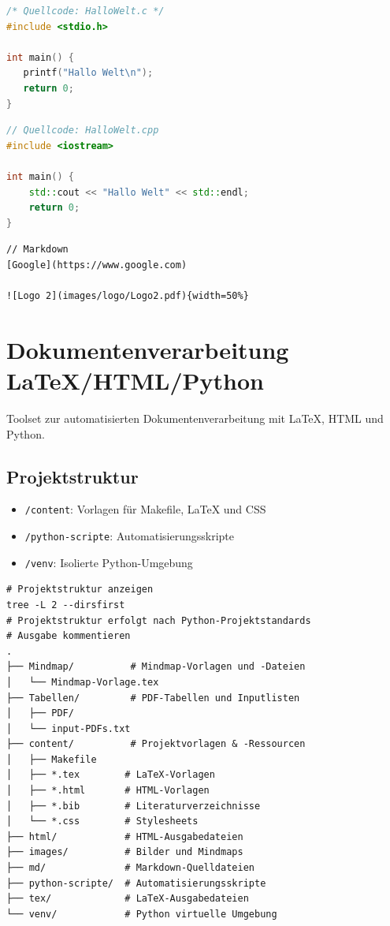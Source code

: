 \documentclass{content/vorlage-design-main}
\begin{document}
\begin{lstlisting}[language=C]
/* Quellcode: HalloWelt.c */
#include <stdio.h>

int main() {
   printf("Hallo Welt\n");
   return 0;
}
\end{lstlisting}

\begin{lstlisting}[language={C++}]
// Quellcode: HalloWelt.cpp
#include <iostream>

int main() {
    std::cout << "Hallo Welt" << std::endl;
    return 0;
}
\end{lstlisting}

\begin{lstlisting}
// Markdown
[Google](https://www.google.com)

![Logo 2](images/logo/Logo2.pdf){width=50%}
\end{lstlisting}

\section{Dokumentenverarbeitung
LaTeX/HTML/Python}\label{dokumentenverarbeitung-latexhtmlpython}

Toolset zur automatisierten Dokumentenverarbeitung mit LaTeX, HTML und
Python.

\subsection{Projektstruktur}\label{projektstruktur}

\begin{itemize}

\item
  \verb|/content|: Vorlagen für Makefile, LaTeX und
  CSS
\item
  \verb|/python-scripte|: Automatisierungsskripte
\item
  \verb|/venv|: Isolierte Python-Umgebung
\end{itemize}

\begin{lstlisting}
# Projektstruktur anzeigen
tree -L 2 --dirsfirst
# Projektstruktur erfolgt nach Python-Projektstandards
# Ausgabe kommentieren
.
├── Mindmap/          # Mindmap-Vorlagen und -Dateien
│   └── Mindmap-Vorlage.tex
├── Tabellen/         # PDF-Tabellen und Inputlisten
│   ├── PDF/
│   └── input-PDFs.txt
├── content/          # Projektvorlagen & -Ressourcen
│   ├── Makefile
│   ├── *.tex        # LaTeX-Vorlagen
│   ├── *.html       # HTML-Vorlagen
│   ├── *.bib        # Literaturverzeichnisse
│   └── *.css        # Stylesheets
├── html/            # HTML-Ausgabedateien
├── images/          # Bilder und Mindmaps
├── md/              # Markdown-Quelldateien
├── python-scripte/  # Automatisierungsskripte
├── tex/             # LaTeX-Ausgabedateien
└── venv/            # Python virtuelle Umgebung
\end{lstlisting}
\end{document}

